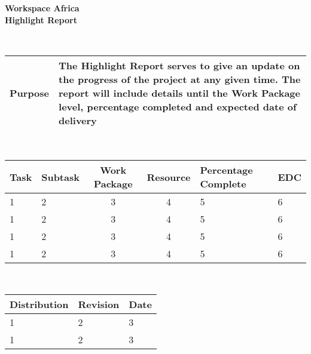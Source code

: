 \documentclass[a4paper,12pt]{article}
\date{07/09/2016}
\author{Preshane Pillay Pillay}
\begin{document}
   \centering
      \begin{Huge}
	{\bfseries Workspace Africa} \\
	{\bfseries Highlight Report} \\ 
      \end{Huge}
  
  \\[4cm]
      
      \begin{tabular}{|p{3cm}|p{10cm}|}
	\hline
	{\bfseries Purpose} & {The Highlight Report serves to give an update on the progress of the project at any given time. The report will include details until the Work Package level, percentage completed and expected date of delivery}\\
	\hline
      \end{tabular}
      
  \\[4cm]
  
    \centering 
    \caption{Highlight Report}
      \begin{small}
	\begin{tabular}{||l|l|c|c|l|l||}
	  \hline
	 {\bfseries Task} & {\bfseries Subtask} &{\bfseries Work Package} & {\bfseries Resource} & {\bfseries Percentage Complete} & {\bfseries EDC} \\
	  \hline
       
	      1 & 2 & 3 & 4 & 5 & 6 \\
	  \hline
	      1 & 2 & 3 & 4 & 5 & 6 \\
	  \hline
	      1 & 2 & 3 & 4 & 5 & 6 \\
	  \hline
	      1 & 2 & 3 & 4 & 5 & 6 \\
	   \hline
	\end{tabular}
      \end{small}
      
      \\[4cm]

      \begin{tabular}{|p{5cm}|p{5cm}|p{2cm}|}
	\hline
	{\bfseries Distribution} & {\bfseries Revision} & {\bfseries Date} \\
	\hline
 
	     1 & 2 & 3 \\
	\hline
	     1 & 2 & 3 \\
	\hline
      \end{tabular}
\end{document}
